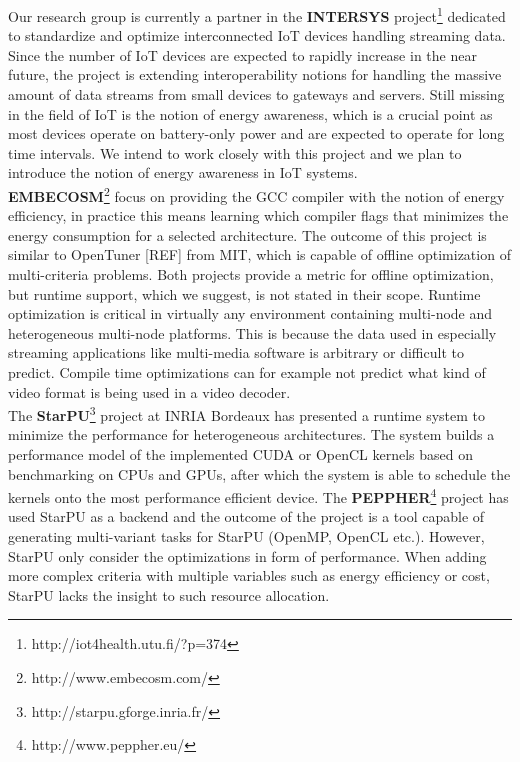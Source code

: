 \documentclass{article}
\begin{document}
Our research group is currently a partner in the \textbf{INTERSYS} project\footnote{http://iot4health.utu.fi/?p=374} dedicated to standardize and optimize interconnected IoT devices handling streaming data. Since the number of IoT devices are expected to rapidly increase in the near future, the project is extending interoperability notions for handling the massive amount of data streams from small devices to gateways and servers. Still missing in the field of IoT is the notion of energy awareness, which is a crucial point as most devices operate on battery-only power and are expected to operate for long time intervals. We intend to work closely with this project and we plan to introduce the notion of energy awareness in IoT systems.\\

\textbf{EMBECOSM}\footnote{http://www.embecosm.com/} focus on providing the GCC compiler with the notion of energy efficiency, in practice this means learning which compiler flags that minimizes the energy consumption for a selected architecture. The outcome of this project is similar to OpenTuner [REF] from MIT, which is capable of offline optimization of multi-criteria problems. Both projects provide a metric for offline optimization, but runtime support, which we suggest, is not stated in their scope. Runtime optimization is critical in virtually any environment containing multi-node and heterogeneous multi-node platforms. This is because the data used in especially streaming applications like multi-media software is arbitrary or difficult to predict. Compile time optimizations can for example not predict what kind of video format is being used in a video decoder.\\

The \textbf{StarPU}\footnote{http://starpu.gforge.inria.fr/} project at INRIA Bordeaux has presented a runtime system to minimize the performance for heterogeneous architectures. The system builds a performance model of the implemented CUDA or OpenCL kernels based on benchmarking on CPUs and GPUs, after which the system is able to schedule the kernels onto the most performance efficient device. The \textbf{PEPPHER}\footnote{http://www.peppher.eu/} project has used StarPU as a backend and the outcome of the project is a tool capable of generating multi-variant tasks for StarPU (OpenMP, OpenCL etc.). However, StarPU only consider the optimizations in form of performance. When adding more complex criteria with multiple variables such as energy efficiency or cost, StarPU lacks the insight to such resource allocation.
\end{document}
